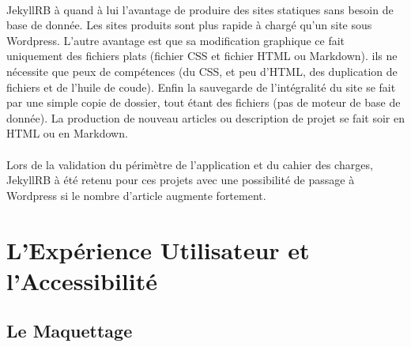\documentclass[11pt,a4paper]{report}
\begin{document}
		\paragraph*{}JekyllRB à quand à lui l'avantage de produire des sites statiques sans besoin de base de donnée. Les sites produits sont plus rapide à chargé qu'un site sous Wordpress. L'autre avantage est que sa modification graphique ce fait uniquement des fichiers plats (fichier CSS et fichier HTML ou Markdown). ils ne nécessite que peux de compétences (du CSS, et peu d'HTML, des duplication de fichiers et de l'huile de coude). Enfin la sauvegarde de l'intégralité du site se fait par une simple copie de dossier, tout étant des fichiers (pas de moteur de base de donnée). La production de nouveau articles ou description de projet se fait soir en HTML ou en Markdown.
		\paragraph*{}Lors de la validation du périmètre de l'application et du cahier des charges, JekyllRB à été retenu pour ces projets avec une possibilité de passage à Wordpress si le nombre d'article augmente fortement.
		\newpage

	\section{L'Expérience Utilisateur et l'Accessibilité}
		\subsection{Le Maquettage}
\end{document}

